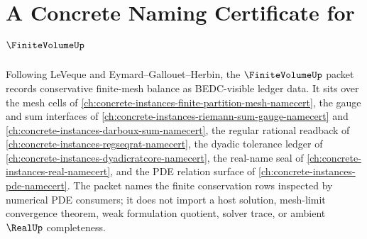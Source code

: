 \chapter{A Concrete Naming Certificate for $\FiniteVolumeUp$}
\label{ch:concrete-instances-finite-volume-namecert}

Following LeVeque and Eymard--Gallouet--Herbin, the $\FiniteVolumeUp$ packet records conservative finite-mesh balance as BEDC-visible ledger data. It sits over the mesh cells of \autoref{ch:concrete-instances-finite-partition-mesh-namecert}, the gauge and sum interfaces of \autoref{ch:concrete-instances-riemann-sum-gauge-namecert} and \autoref{ch:concrete-instances-darboux-sum-namecert}, the regular rational readback of \autoref{ch:concrete-instances-regseqrat-namecert}, the dyadic tolerance ledger of \autoref{ch:concrete-instances-dyadicratcore-namecert}, the real-name seal of \autoref{ch:concrete-instances-real-namecert}, and the PDE relation surface of \autoref{ch:concrete-instances-pde-namecert}. The packet names the finite conservation rows inspected by numerical PDE consumers; it does not import a host solution, mesh-limit convergence theorem, weak formulation quotient, solver trace, or ambient $\RealUp$ completeness.


